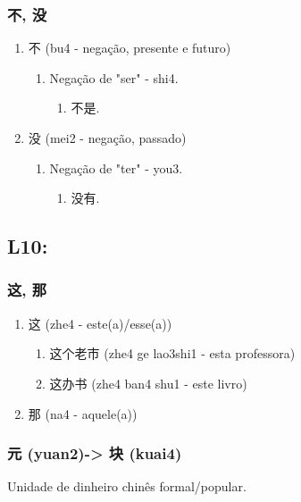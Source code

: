 \documentclass[11pt]{article}
\begin{document}
\subsubsection{不, 没}
\label{sec:org25bec39}
\begin{enumerate}
\item 不 (bu4 - negação, presente e futuro)
\begin{enumerate}
\item Negação de "ser" - shi4.
\begin{enumerate}
\item 不是.
\end{enumerate}
\end{enumerate}

\item 没 (mei2 - negação, passado)
\begin{enumerate}
\item Negação de "ter" - you3.
\begin{enumerate}
\item 没有.
\end{enumerate}
\end{enumerate}
\end{enumerate}


\subsection{L10:}
\label{sec:orgcb1ed94}
\subsubsection{这, 那}
\label{sec:org83bc5a1}
\begin{enumerate}
\item 这 (zhe4 - este(a)/esse(a))
\label{sec:org23a865a}
\begin{enumerate}
\item 这个老市 (zhe4 ge lao3shi1 - esta professora)
\item 这办书 (zhe4 ban4 shu1 - este livro)
\end{enumerate}

\item 那 (na4 - aquele(a))
\label{sec:orgc6b9936}
\end{enumerate}

\subsubsection{元 (yuan2)-> 块 (kuai4)}
\label{sec:orgf8fa839}
Unidade de dinheiro chinês formal/popular.
\end{document}
